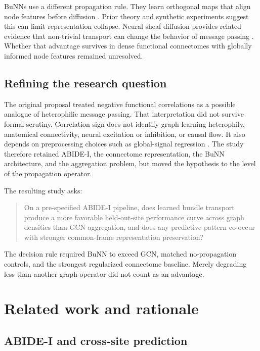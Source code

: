 \documentclass[11pt,a4paper]{article}
\begin{document}
BuNNs use a different propagation rule. They learn orthogonal maps that align
node features before diffusion \cite{bamberger2025bundle}. Prior theory and
synthetic experiments suggest this can limit representation collapse. Neural
sheaf diffusion provides related evidence that non-trivial transport can
change the behavior of message passing \cite{bodnar2022sheaf}. Whether that
advantage survives in dense functional connectomes with globally informed
node features remained unresolved.

\subsection{Refining the research question}

The original proposal treated negative functional correlations as a possible
analogue of heterophilic message passing. That interpretation did not survive
formal scrutiny. Correlation sign does not identify graph-learning
heterophily, anatomical connectivity, neural excitation or inhibition, or
causal flow. It also depends on preprocessing choices such as global-signal
regression \cite{murphy2017global}. The study therefore retained ABIDE-I, the
connectome representation, the BuNN architecture, and the aggregation problem,
but moved the hypothesis to the level of the propagation operator.

The resulting study asks:

\begin{quote}
On a pre-specified ABIDE-I pipeline, does learned bundle transport produce a
more favorable held-out-site performance curve across graph densities than
GCN aggregation, and does any predictive pattern co-occur with stronger
common-frame representation preservation?
\end{quote}

The decision rule required BuNN to exceed GCN, matched no-propagation controls,
and the strongest regularized connectome baseline. Merely degrading less than
another graph operator did not count as an advantage.

\section{Related work and rationale}

\subsection{ABIDE-I and cross-site prediction}
\end{document}
